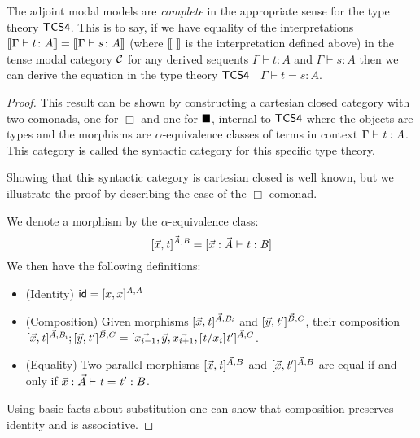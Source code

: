 \begin{theorem*}
\label{thm:tcs4-completeness}
The adjoint modal models are \textit{complete} in the appropriate
sense for the type theory $\sf{TCS4}$. This is to say, if we have
equality of the interpretations $\sem{\Gamma \vdash t \colon A} =
\sem{\Gamma \vdash s \colon A}$ (where \mbox{$\sem{\ } $} is the
interpretation defined above) in the tense modal category $\cal C$ for
any derived sequents $\Gamma \vdash t \colon A$ and $\Gamma \vdash s
\colon A$ then we can derive the equation in the type theory
$\sf{TCS4}$ $\;$ $\Gamma \vdash t = s \colon A$.
\end{theorem*}

\begin{proof}
  This result can be shown by constructing a cartesian closed category
  with two comonads, one for $\Box$ and one for $\blacksquare$, internal to
  $\sf{TCS4}$ where the objects are types and the morphisms are
  $\alpha$-equivalence classes of terms in context $\Gamma  \vdash  \mathit{t}  :  \mathit{A}$.
  This category is called the syntactic category for this specific
  type theory.

  Showing that this syntactic category is cartesian closed is well
  known, but we illustrate the proof by describing the case of the
  $\Box$ comonad.

  We denote a morphism by the $\alpha$-equivalence class:
  \[
  [\vec{x},\mathit{t} ]^{\vec{\mathit{A}},\mathit{B}} = [ \vec{x}:\vec{\mathit{A}} \vdash \mathit{t} : \mathit{B} ]
  \]
  We then have the following definitions:
  \begin{itemize}
  \item (Identity) $\mathsf{id} = [x,x]^{\mathit{A},\mathit{A}}$
  \item (Composition) Given morphisms $[\vec{x},\mathit{t} ]^{\vec{A},\mathit{B_{\mathit{i}}}}$ and
    $[\vec{y},\mathit{t'} ]^{\vec{B},C}$, their composition
    $[\vec{x},\mathit{t} ]^{\vec{A},\mathit{B_{\mathit{i}}}};[\vec{y},\mathit{t'} ]^{\vec{B},C} =
    [\vec{x_{i-1}},\vec{y},\vec{x_{i+1}},[ \mathit{t} / x_i ] \mathit{t'} ]^{\vec{A},C}$.
  \item (Equality) Two parallel morphisms $[\vec{x},\mathit{t} ]^{\vec{A},B}$ and $[\vec{x},\mathit{t'} ]^{\vec{A},B}$ are
    equal if and only if
    $\vec{x} : \vec{A} \vdash \mathit{t} = \mathit{t'} : B$.
  \end{itemize}
  Using basic facts about substitution one can show that composition
  preserves identity and is associative.


\end{proof}
